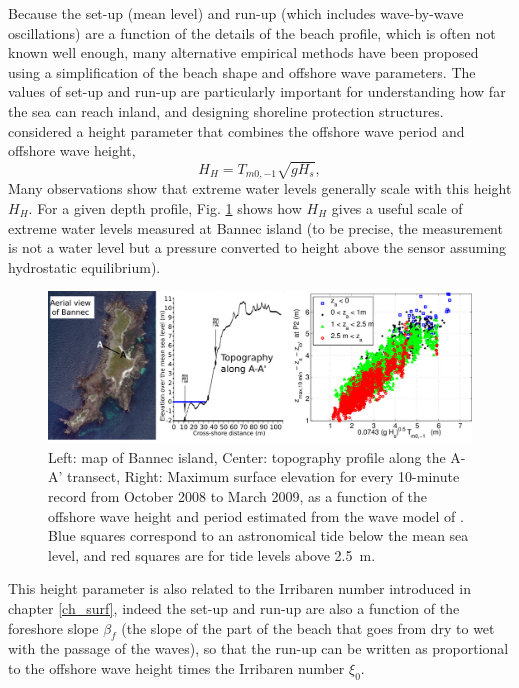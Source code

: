 Because the set-up (mean level) and run-up (which includes wave-by-wave oscillations) are a function of the details of the beach profile, which is often not known well enough, many alternative empirical methods have been proposed using a simplification of the beach shape and offshore wave parameters. The values of set-up and run-up are particularly important for understanding how far the sea can reach inland, and designing shoreline protection structures.  \cite{Hunt1959} considered a height parameter that combines the offshore wave period and offshore wave height, 
\begin{equation}
H_H=T_{m0,-1} \sqrt{g H_s},
\end{equation}
Many observations show that extreme water levels generally scale with this height $H_H$.  For a given depth profile, Fig. \ref{bannec_runup}  shows how $H_H$ gives a useful scale of extreme water levels measured at Bannec island (to be precise, the measurement is not a water level but a pressure converted to height above the sensor assuming hydrostatic equilibrium). 
\begin{figure}
\centerline{\includegraphics[width=\textwidth]{FIGS_CH_NEARSHORE/bannec_runup.jpg}}
  \caption{Left: map of Bannec island, Center: topography profile along the A-A' transect, Right: Maximum surface elevation for every 10-minute record from October 2008 to March 2009, as a function of the offshore wave height and period estimated from the wave model of \cite{Ardhuin&Magne2010}. Blue squares correspond to an astronomical tide below the mean sea level, and red squares are for tide levels above 2.5~m.}
\label{bannec_runup}
\end{figure}
This height parameter is also related to the Irribaren number introduced in chapter \ref{ch_surf}, indeed the set-up and run-up are also a function of the foreshore slope $\beta_f$ (the slope of the part of the beach that goes from dry to wet with the passage of the waves), so that the run-up can be written as proportional to the offshore wave height times the Irribaren number $\xi_0$. 

